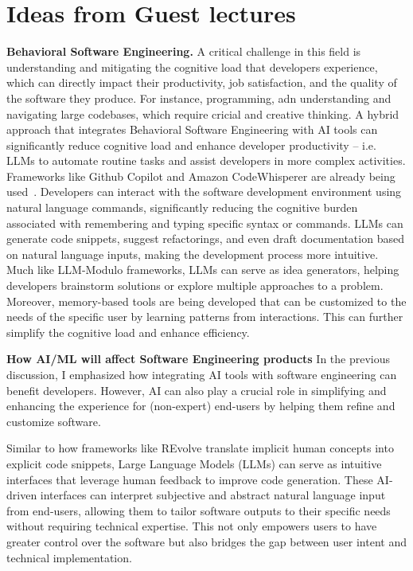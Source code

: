 \documentclass[11pt]{article}
\begin{document}
\section*{Ideas from Guest lectures}

\textbf{Behavioral Software Engineering.} A critical challenge in this field is understanding and mitigating the cognitive load that developers experience, which can directly impact their productivity, job satisfaction, and the quality of the software they produce. For instance, programming, adn understanding and navigating large codebases, which require cricial and creative thinking. A hybrid approach that integrates Behavioral Software Engineering with AI tools can significantly reduce cognitive load and enhance developer productivity -- i.e. LLMs to automate routine tasks and assist developers in more complex activities. Frameworks like Github Copilot and Amazon CodeWhisperer are already being used~\cite{codex}. Developers can interact with the software development environment using natural language commands, significantly reducing the cognitive burden associated with remembering and typing specific syntax or commands. LLMs can generate code snippets, suggest refactorings, and even draft documentation based on natural language inputs, making the development process more intuitive. Much like LLM-Modulo frameworks, LLMs can serve as idea generators, helping developers brainstorm solutions or explore multiple approaches to a problem. Moreover, memory-based tools are being developed that can be customized to the needs of the specific user by learning patterns from interactions. This can further simplify the cognitive load and enhance efficiency.

\hspace{-6mm}\textbf{How AI/ML will affect Software Engineering products}
In the previous discussion, I emphasized how integrating AI tools with software engineering can benefit developers. However, AI can also play a crucial role in simplifying and enhancing the experience for (non-expert) end-users by helping them refine and customize software.

Similar to how frameworks like REvolve translate implicit human concepts into explicit code snippets, Large Language Models (LLMs) can serve as intuitive interfaces that leverage human feedback to improve code generation. These AI-driven interfaces can interpret subjective and abstract natural language input from end-users, allowing them to tailor software outputs to their specific needs without requiring technical expertise. This not only empowers users to have greater control over the software but also bridges the gap between user intent and technical implementation.
\end{document}
